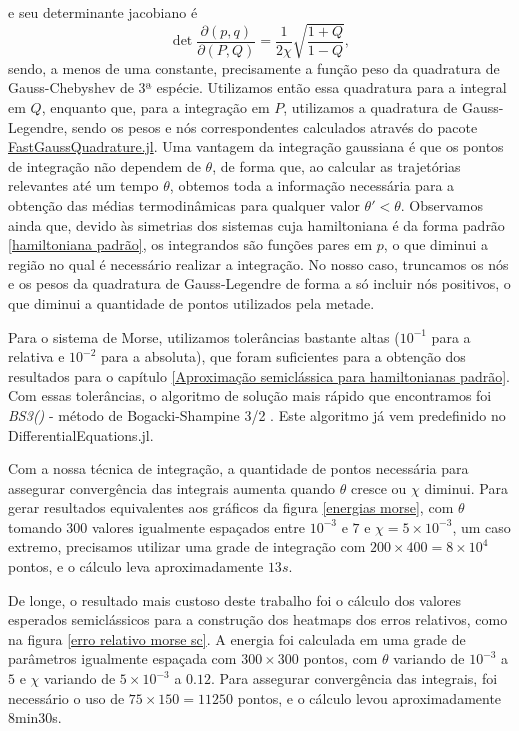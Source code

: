 \documentclass[
	12pt,
	oneside,			%
	a4paper,			%
	english,			%
	brazil				%
	]{abntex2}
\theoremstyle{definition}
\begin{document}
\begin{apendicesenv}
\begin{equation}
\end{equation}
e seu determinante jacobiano é
\begin{equation}
    \det \frac{\partial (p,q)}{\partial (P,Q)}  = \frac{1}{2\chi} \sqrt{\frac{1+Q}{1-Q}},
\end{equation}
sendo, a menos de uma constante, precisamente a função peso da quadratura de Gauss-Chebyshev de 3ª espécie. Utilizamos então essa quadratura para a integral em $Q$, enquanto que, para a integração em $P$, utilizamos a quadratura de Gauss-Legendre, sendo os pesos e nós correspondentes calculados através do pacote \href{https://github.com/JuliaApproximation/FastGaussQuadrature.jl}{FastGaussQuadrature.jl}. Uma vantagem da integração gaussiana é que os pontos de integração não dependem de $\theta$, de forma que, ao calcular as trajetórias relevantes até um tempo $\theta$, obtemos toda a informação necessária para a obtenção das médias termodinâmicas para qualquer valor $\theta ' < \theta$. Observamos ainda que, devido às simetrias dos sistemas cuja hamiltoniana é da forma padrão \eqref{hamiltoniana padrão}, os integrandos são funções pares em $p$, o que diminui a região no qual é necessário realizar a integração. No nosso caso, truncamos os nós e os pesos da quadratura de Gauss-Legendre de forma a só incluir nós positivos, o que diminui a quantidade de pontos utilizados pela metade.

Para o sistema de Morse, utilizamos tolerâncias bastante altas ($10^{-1}$ para a relativa e $10^{-2}$ para a absoluta), que foram suficientes para a obtenção dos resultados para o capítulo \ref{Aproximação semiclássica para hamiltonianas padrão}. Com essas tolerâncias, o algoritmo de solução mais rápido que encontramos foi \textit{BS3()} - método de Bogacki-Shampine 3/2 \cite{BOGACKI1989321}. Este algoritmo já vem predefinido no DifferentialEquations.jl.

Com a nossa técnica de integração, a quantidade de pontos necessária para assegurar convergência das integrais aumenta quando $\theta$ cresce ou $\chi$ diminui. Para gerar resultados equivalentes aos gráficos da figura \ref{energias morse}, com $\theta$ tomando $300$ valores igualmente espaçados entre $10^{-3}$ e $7$ e $\chi = 5 \times 10^{-3}$, um caso extremo, precisamos utilizar uma grade de integração com $200 \times 400 = 8 \times 10^4$ pontos, e o cálculo leva aproximadamente $13s$.

De longe, o resultado mais custoso deste trabalho foi o cálculo dos valores esperados semiclássicos para a construção dos heatmaps dos erros relativos, como na figura \ref{erro relativo morse sc}. A energia foi calculada em uma grade de parâmetros igualmente espaçada com $300 \times 300$ pontos, com $\theta$ variando de $10^{-3}$ a $5$ e $\chi$ variando de $5 \times 10^{-3}$ a $0.12$. Para assegurar convergência das integrais, foi necessário o uso de $75 \times 150 = 11250$ pontos, e o cálculo levou aproximadamente 8min30s.

\end{apendicesenv}

\end{document}
